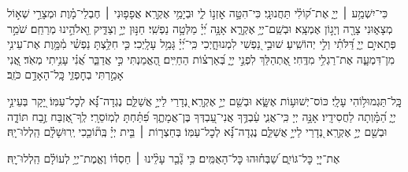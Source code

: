 \documentclass[twoside, openany, parskip=half, 11pt]{book}
\begin{document}
{
\begin{narrow} 
כִּי־יִשְׁמַ֥ע ׀ יְיָ֑ אֶת־ק֝וֹלִ֗י תַּחֲנוּנָֽי׃
כִּי־הִטָּ֣ה אׇזְנ֣וֹ לִ֑י וּבְיָמַ֥י אֶקְרָֽא׃
אֲפָפ֤וּנִי ׀ חֶבְלֵי־מָ֗וֶת וּמְצָרֵ֣י שְׁא֣וֹל מְצָא֑וּנִי צָרָ֖ה וְיָג֣וֹן אֶמְצָֽא׃
וּבְשֵֽׁם־יְיָ֥ אֶקְרָ֑א אָנָּ֥ה יְ֝יָ֗ מַלְּטָ֥ה נַפְשִֽׁי׃
חַנּ֣וּן יְיָ֣ וְצַדִּ֑יק וֵ֖אלֹהֵ֣ינוּ מְרַחֵֽם׃
שֹׁמֵ֣ר פְּתָאיִ֣ם יְיָ֑ דַּ֝לֹּתִ֗י וְלִ֣י יְהוֹשִֽׁיעַ׃
שׁוּבִ֣י נַ֭פְשִׁי לִמְנוּחָ֑יְכִי כִּֽי־יְ֝יָ֗ גָּמַ֥ל עָלָֽיְכִי׃
כִּ֤י חִלַּ֥צְתָּ נַפְשִׁ֗י מִ֫מָּ֥וֶת אֶת־עֵינִ֥י מִן־דִּמְעָ֑ה אֶת־רַגְלִ֥י מִדֶּֽחִי׃
אֶ֭תְהַלֵּךְ לִפְנֵ֣י יְיָ֑ בְּ֝אַרְצ֗וֹת הַחַיִּֽים׃
הֶ֭אֱמַנְתִּי כִּ֣י אֲדַבֵּ֑ר אֲ֝נִ֗י עָנִ֥יתִי מְאֹֽד׃
אֲ֭נִי אָמַ֣רְתִּי בְחׇפְזִ֑י כׇּֽל־הָאָדָ֥ם כֹּזֵֽב׃
\end{narrow}
כׇּֽל־תַּגְמוּל֥וֹהִי עָלָֽי׃
כּוֹס־יְשׁוּע֥וֹת אֶשָּׂ֑א וּבְשֵׁ֖ם יְיָ֣ אֶקְרָֽא׃
נְ֭דָרַי לַייָ֣ אֲשַׁלֵּ֑ם נֶגְדָה־נָּ֗֝א לְכׇל־עַמּֽוֹ׃
יָ֭קָר בְּעֵינֵ֣י יְיָ֑ הַ֝מָּ֗וְתָה לַחֲסִידָֽיו׃
אָנָּ֣ה יְיָ כִּֽי־אֲנִ֢י עַ֫בְדֶּ֥ךָ אֲנִי־עַ֭בְדְּךָ בֶּן־אֲמָתֶ֑ךָ פִּ֝תַּ֗חְתָּ לְמֽוֹסֵרָֽי׃
לְֽךָ־אֶ֭זְבַּח זֶ֣בַח תּוֹדָ֑ה וּבְשֵׁ֖ם יְיָ֣ אֶקְרָֽא׃
נְ֭דָרַי לַייָ֣ אֲשַׁלֵּ֑ם נֶגְדָה־נָּ֗֝א לְכׇל־עַמּֽוֹ׃
בְּחַצְר֤וֹת ׀ בֵּ֤ית יְיָ֗ בְּֽת֘וֹכֵ֤כִי יְֽרוּשָׁלָ֗‍ִם הַֽלְלוּ־יָֽהּ׃

אֶת־יְיָ֭ כׇּל־גּוֹיִ֑ם שַׁ֝בְּח֗וּהוּ כׇּל־הָאֻמִּֽים׃
כִּ֥י גָ֘בַ֤ר עָלֵ֨ינוּ ׀ חַסְדּ֗וֹ וֶאֱמֶת־יְיָ֥ לְעוֹלָ֗ם
הַֽלְלוּ־יׇֽהּ׃

}
\end{document}
